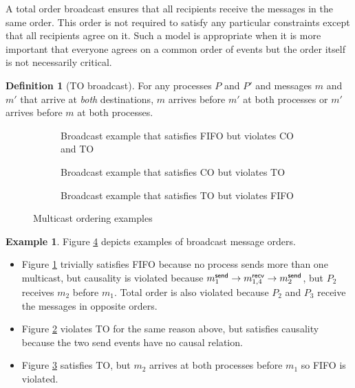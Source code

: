 \documentclass[]             %
{NASA}                       %
\theoremstyle{definition}
\newtheorem{example}[theorem]{Example}
\newtheorem{definition}[theorem]{Definition}
\providecommand{\tightlist}{%
  \setlength{\itemsep}{0pt}\setlength{\parskip}{0pt}}
\begin{document}
A total order broadcast ensures that all recipients receive the
messages in the same order. This order is not required to satisfy any
particular constraints except that all recipients agree on it. Such a
model is appropriate when it is more important that everyone agrees on
a common order of events but the order itself is not necessarily
critical.

\begin{definition}[TO broadcast]
  \label{def:totalorderbroadcast} For any processes $P$ and $P'$ and
  messages $m$ and $m'$ that arrive at \emph{both} destinations, $m$
  arrives before $m'$ at both processes or $m'$ arrives before $m$ at
  both processes.
\end{definition}

\begin{figure}[p]
  \setlength\belowcaptionskip{5ex}
  \begin{subfigure}{1\textwidth}
    \centering
    
    \caption{Broadcast example that satisfies FIFO but violates CO and TO}
    \label{fig:bcast-order-examples-1}
  \end{subfigure}
  \begin{subfigure}{1\textwidth}
    \centering
    
    \caption{Broadcast example that satisfies CO but violates TO}
    \label{fig:bcast-order-examples-2}
  \end{subfigure}
  \begin{subfigure}{1\textwidth}
    \centering
    
    \caption{Broadcast example that satisfies TO but violates FIFO}
    \label{fig:bcast-order-examples-3}
  \end{subfigure}
  \caption{Multicast ordering examples}
  \label{fig:bcast-ordering-examples}
\end{figure}

\begin{example}
Figure \ref{fig:bcast-ordering-examples} depicts examples of broadcast
message orders.
\begin{itemize}
  \tightlist
\item Figure \ref{fig:bcast-order-examples-1} trivially satisfies FIFO
  because no process sends more than one multicast, but causality is
  violated because $m_{1}^{\mathsf{send}} \to m_{1,4}^{\mathsf{recv}} \to m_{2}^{\mathsf{send}}$, but
  $P_2$ receives $m_2$ before $m_1$. Total order is also violated
  because $P_2$ and $P_3$ receive the messages in opposite orders.
\item Figure \ref{fig:bcast-order-examples-2} violates TO for the same
  reason above, but satisfies causality because the two send events
  have no causal relation.
\item Figure \ref{fig:bcast-order-examples-3}
  satisfies TO, but $m_2$ arrives at both processes before $m_1$ so
  FIFO is violated.
\end{itemize}
\end{example}
\end{document}
